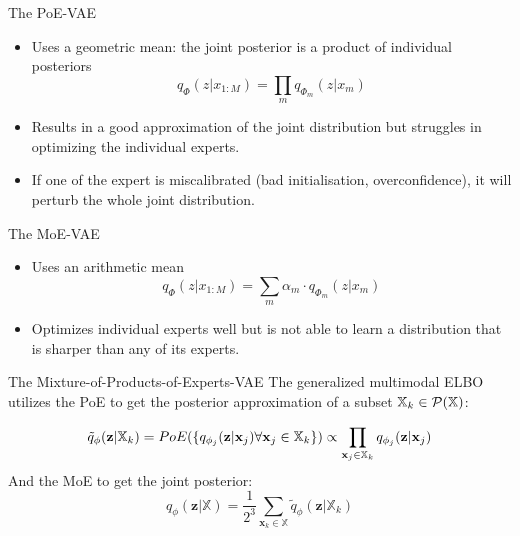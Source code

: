     \begin{frame}{The PoE-VAE}

        \begin{itemize}
            \item Uses a geometric mean: the joint posterior is a product of individual posteriors
            \begin{equation}
                q_{\Phi}(z|x_{1:M})=\prod _m q_{\Phi_m}(z|x_m)
            \end{equation}
            \item Results in a good approximation of the joint distribution but struggles in optimizing the individual experts.
            \item If one of the expert is miscalibrated (bad initialisation, overconfidence), it will perturb the whole joint distribution. 
        \end{itemize}
    \end{frame}

    \begin{frame}{The MoE-VAE}
        \begin{itemize}
            \item Uses an arithmetic mean
            \begin{equation}
                q_{\Phi}(z|x_{1:M})=\sum _m \alpha_m\cdot q_{\Phi_m}(z|x_m)
            \end{equation}
            \item Optimizes individual experts well but is not able to learn a distribution that is sharper than any of its experts.
        \end{itemize}

    \end{frame}

    \begin{frame}{The Mixture-of-Products-of-Experts-VAE}
        The generalized multimodal ELBO utilizes the PoE to get the posterior approximation of a subset $\mathbb{X}_k \in \mathcal{P}(\mathbb{X})$:

        \begin{equation}
            \tilde{q}_{\phi}(\textbf{z}|\mathbb{X}_k)=PoE(\{q_{\phi_j}(\textbf{z}|\textbf{x}_j) \forall \textbf{x}_j \in \mathbb{X}_k\}) \propto \prod _{\textbf{x}_j \in \mathbb{X}_k}q_{\phi_j}(\textbf{z}|\textbf{x}_j)
        \end{equation}
        And the MoE to get the joint posterior:
        \begin{equation}
            q_{\phi}(\textbf{z}|\mathbb{X}) = \frac{1}{2^3} \sum _{\textbf{x}_k \in \mathbb{X}} \tilde{q}_{\phi} (\textbf{z}|\mathbb{X}_k)
        \end{equation}
    \end{frame}

